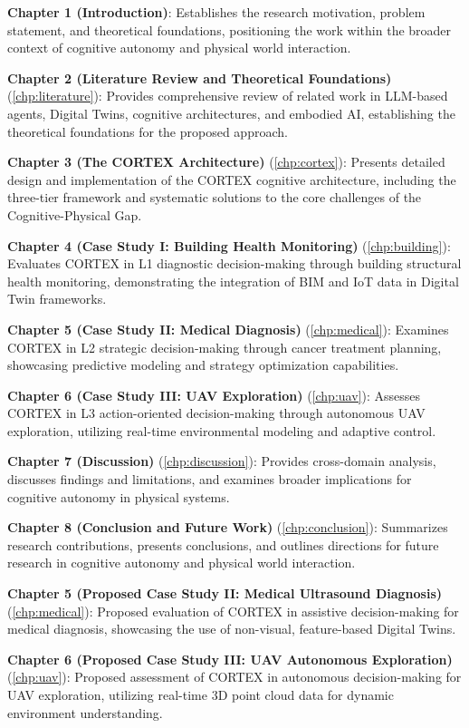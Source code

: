 \textbf{Chapter 1 (Introduction)}: Establishes the research motivation, problem statement, and theoretical foundations, positioning the work within the broader context of cognitive autonomy and physical world interaction.

\textbf{Chapter 2 (Literature Review and Theoretical Foundations)} (\autoref{chp:literature}): Provides comprehensive review of related work in LLM-based agents, Digital Twins, cognitive architectures, and embodied AI, establishing the theoretical foundations for the proposed approach.

\textbf{Chapter 3 (The CORTEX Architecture)} (\autoref{chp:cortex}): Presents detailed design and implementation of the CORTEX cognitive architecture, including the three-tier framework and systematic solutions to the core challenges of the Cognitive-Physical Gap.

\textbf{Chapter 4 (Case Study I: Building Health Monitoring)} (\autoref{chp:building}): Evaluates CORTEX in L1 diagnostic decision-making through building structural health monitoring, demonstrating the integration of BIM and IoT data in Digital Twin frameworks.

\textbf{Chapter 5 (Case Study II: Medical Diagnosis)} (\autoref{chp:medical}): Examines CORTEX in L2 strategic decision-making through cancer treatment planning, showcasing predictive modeling and strategy optimization capabilities.

\textbf{Chapter 6 (Case Study III: UAV Exploration)} (\autoref{chp:uav}): Assesses CORTEX in L3 action-oriented decision-making through autonomous UAV exploration, utilizing real-time environmental modeling and adaptive control.

\textbf{Chapter 7 (Discussion)} (\autoref{chp:discussion}): Provides cross-domain analysis, discusses findings and limitations, and examines broader implications for cognitive autonomy in physical systems.

\textbf{Chapter 8 (Conclusion and Future Work)} (\autoref{chp:conclusion}): Summarizes research contributions, presents conclusions, and outlines directions for future research in cognitive autonomy and physical world interaction.

\textbf{Chapter 5 (Proposed Case Study II: Medical Ultrasound Diagnosis)} (\autoref{chp:medical}): Proposed evaluation of CORTEX in assistive decision-making for medical diagnosis, showcasing the use of non-visual, feature-based Digital Twins.

\textbf{Chapter 6 (Proposed Case Study III: UAV Autonomous Exploration)} (\autoref{chp:uav}): Proposed assessment of CORTEX in autonomous decision-making for UAV exploration, utilizing real-time 3D point cloud data for dynamic environment understanding.

